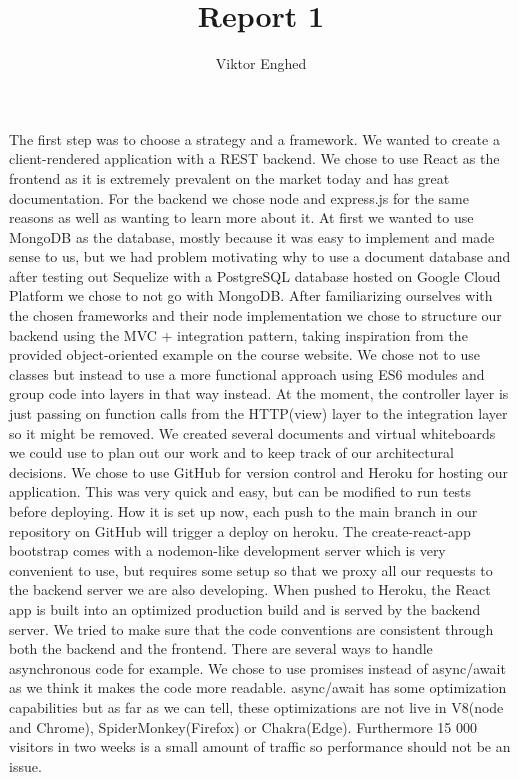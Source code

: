\documentclass{article}
\title{Report 1}
\author{Viktor Enghed}
\begin{document}
\begin{titlepage}
    \maketitle
\end{titlepage}
    The first step was to choose a strategy and a framework. We wanted to
    create a client-rendered application with a REST backend. We chose to use
    React as the frontend as it is extremely prevalent on the market today and
    has great documentation. For the backend we chose node and express.js for 
    the same reasons as well as wanting to learn more about it. 
    \newline
    At first we wanted to use MongoDB as the database, mostly because it was
    easy to implement and made sense to us, but we had problem motivating why
    to use a document database and after testing out Sequelize with a PostgreSQL
    database hosted on Google Cloud Platform we chose to not go with MongoDB.
    \newline
    After familiarizing ourselves with the chosen frameworks and their node 
    implementation we chose to structure our backend using the MVC + integration pattern, taking
    inspiration from the provided object-oriented example on the course website.
    We chose not to use classes but instead to use a more functional approach using
    ES6 modules and group code into layers in that way instead. At the moment, 
    the controller layer is just passing on function calls from the HTTP(view) layer to
    the integration layer so it might be removed.
    \newline
    We created several documents and virtual whiteboards we could use to plan out
    our work and to keep track of our architectural decisions. We chose to use GitHub
    for version control and Heroku for hosting our application. This was very quick
    and easy, but can be modified to run tests before deploying. How it is set up now, 
    each push to the main branch in our repository on GitHub will trigger a deploy on heroku.
    The create-react-app bootstrap comes with a nodemon-like development server which is very
    convenient to use, but requires some setup so that we proxy all our requests to the backend
    server we are also developing. When pushed to Heroku, the React app is built into an optimized production build and is served by
    the backend server.
    \newline
    We tried to make sure that the code conventions are consistent through both
    the backend and the frontend. There are several ways to handle asynchronous 
    code for example. We chose to use promises instead of async/await as we think
    it makes the code more readable. async/await has some optimization capabilities
    but as far as we can tell, these optimizations are not live in V8(node and Chrome),
    SpiderMonkey(Firefox) or Chakra(Edge). Furthermore 15 000 visitors in two weeks is
    a small amount of traffic so performance should not be an issue.
\end{document}
